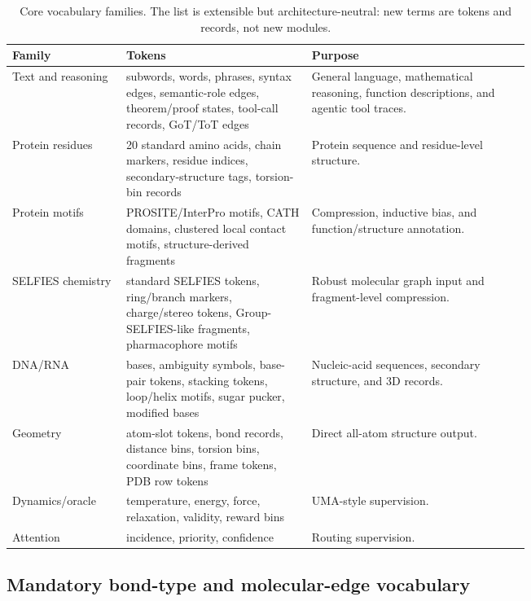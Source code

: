 \documentclass[11pt]{article}
\newcommand{\1}{\mathbf{1}}
\begin{document}
\begingroup\scriptsize\setlength{\tabcolsep}{2pt}
\begin{longtable}{p{0.13\linewidth}p{0.28\linewidth}p{0.33\linewidth}}
\caption{Core vocabulary families. The list is extensible but architecture-neutral: new terms are tokens and records, not new modules.}\\
\toprule
Family & Tokens & Purpose \\
\midrule
\endhead
Text and reasoning & subwords, words, phrases, syntax edges, semantic-role edges, theorem/proof states, tool-call records, GoT/ToT edges & General language, mathematical reasoning, function descriptions, and agentic tool traces. \\
Protein residues & 20 standard amino acids, chain markers, residue indices, secondary-structure tags, torsion-bin records & Protein sequence and residue-level structure. \\
Protein motifs & PROSITE/InterPro motifs, CATH domains, clustered local contact motifs, structure-derived fragments & Compression, inductive bias, and function/structure annotation. \\
SELFIES chemistry & standard SELFIES tokens, ring/branch markers, charge/stereo tokens, Group-SELFIES-like fragments, pharmacophore motifs & Robust molecular graph input and fragment-level compression. \\
DNA/RNA & bases, ambiguity symbols, base-pair tokens, stacking tokens, loop/helix motifs, sugar pucker, modified bases & Nucleic-acid sequences, secondary structure, and 3D records. \\
Geometry & atom-slot tokens, bond records, distance bins, torsion bins, coordinate bins, frame tokens, PDB row tokens & Direct all-atom structure output. \\
Dynamics/oracle & temperature, energy, force, relaxation, validity, reward bins & UMA-style supervision. \\
Attention & incidence, priority, confidence & Routing supervision. \\
\bottomrule

\end{longtable}\endgroup

\subsection{Mandatory bond-type and molecular-edge vocabulary}
\end{document}
